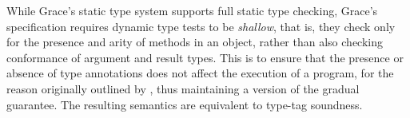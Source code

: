 While Grace's static type system supports full static type
checking\citep{graceOnward12}, Grace's specification requires dynamic
type tests to be \emph{shallow}, that is, they check only for the
presence and arity of methods in an object, rather than also checking
conformance of argument and result types.  This is to ensure that the
presence or absence of type annotations does not affect the execution
of a program, for the reason originally outlined by
\citet{Boyland2014}, thus maintaining a version of the gradual
guarantee.  The resulting semantics are  equivalent to
type-tag soundness\citep{reticPython2014,Vitousek2017,Greenman2018}.




